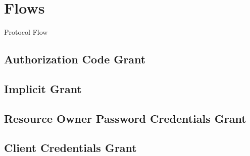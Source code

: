 \section{Flows}
Protocol Flow
\subsection{Authorization Code Grant}
\subsection{Implicit Grant}
\subsection{Resource Owner Password Credentials Grant}
\subsection{Client Credentials Grant}


\blindtext{}
